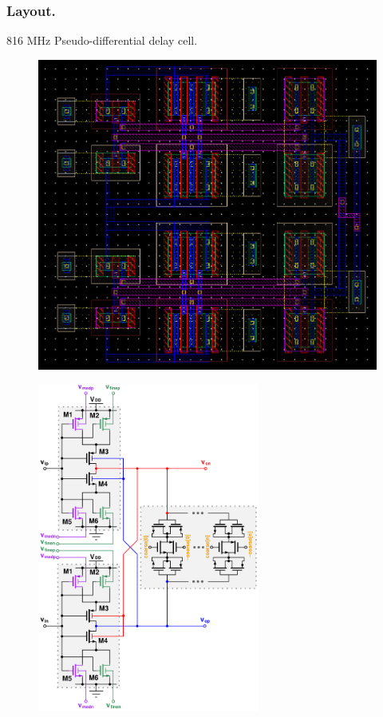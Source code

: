 \documentclass[t, screen, aspectratio=43]{beamer}
\begin{document}
\begin{frame}
	\frametitle{Layout.}
	\begin{block}{816 MHz Pseudo-differential delay cell.}
		\begin{minipage}{6cm}
			\vspace{1em}
			\tiny
			\begin{figure}[htb!]
			        \centering
			        \includegraphics[width=1\textwidth, angle=0]{delay_cell_layout}
			\end{figure}
		\end{minipage}%
		\begin{minipage}{6cm}
			\begin{figure}[htb!]
			        \centering
			        \includegraphics[width=0.65\textwidth, angle=0]{telescopic_pseudodiff_delay_cell_all_tune2}

\end{figure}
\end{minipage}
\end{block}
\end{frame}
\end{document}

